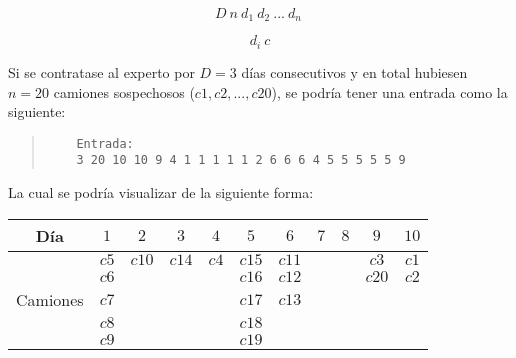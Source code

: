\documentclass[11pt, a4paper, twoside]{article}
\begin{document}
\begin{minipage}[t]{0.5\textwidth}
\[
  D\ n\ d_{1}\ d_{2}\ ...\ d_{n}\
\]

\end{minipage}
\begin{minipage}[t]{0.5\textwidth}
\[
  d_{i}\ c
\]

\end{minipage}

\newpage
{}

\begin{ejemplo}\hspace{0em}

Si se contratase al experto por $D=3$ días consecutivos y en total hubiesen $n=20$
camiones sospechosos ($c1,c2,...,c20$), se podría tener una entrada como la siguiente:

  \begin{quote}
    \begin{verbatim}
    Entrada:
    3 20 10 10 9 4 1 1 1 1 1 2 6 6 6 4 5 5 5 5 5 9
    \end{verbatim}
  \end{quote}
  
  \vspace{-2em}
    \begin{center}
      La cual se podría visualizar de la siguiente forma:
      
      \renewcommand{\arraystretch}{1.2} %
      \begin{tabular}{|c|c|c|c|c|c|c|c|c|c|c|}
        \hline
        Día          &  $1$  & $2$   & $3$   & $4$   & $5$   & $6$ & $7$ & $8$ & $9$   & $10$  \\
        \hline
                     & $c5$ & $c10$ & $c14$ & $c4$ & $c15$ & $c11$ &   &     & $c3$  & $c1$  \\
                     & $c6$ &       &       &       & $c16$ & $c12$ &   &     & $c20$ & $c2$  \\    
        Camiones     & $c7$ &       &       &       & $c17$ & $c13$ &   &     &       &       \\  
                     & $c8$ &       &       &       & $c18$ &       &   &     &       &       \\
                     & $c9$ &       &       &       & $c19$ &       &   &     &       &       \\
        \hline
      \end{tabular}
    \end{center}


\end{ejemplo}
\end{document}
